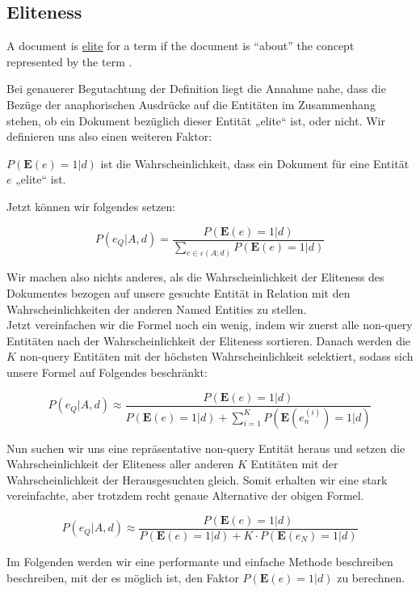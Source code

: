 \subsection{Eliteness}

\begin{defi}
	A document is \underline{elite} for a term if the document is ``about'' the concept represented by the term \cite{paper:Robertson}.
\end{defi}


Bei genauerer Begutachtung der Definition liegt die Annahme nahe, dass die Bezüge der anaphorischen Ausdrücke auf die Entitäten im Zusammenhang stehen, ob ein Dokument bezüglich dieser Entität „elite“ ist, oder nicht. Wir definieren uns also einen weiteren Faktor:

\begin{defi}
$P(\textbf{E}(e) = 1 | d)$ ist die Wahrscheinlichkeit, dass ein Dokument für eine Entität $e$ „elite“ ist.
\end{defi}

Jetzt können wir folgendes setzen:

\[ P(e_Q | A,d) = \frac{P(\textbf{E}(e) = 1 | d)}{\sum_{e \in \varepsilon (A;d)} P(\textbf{E}(e) = 1 | d)} \]

Wir machen also nichts anderes, als die Wahrscheinlichkeit der Eliteness des Dokumentes bezogen auf unsere gesuchte Entität in Relation mit den Wahrscheinlichkeiten der anderen Named Entities zu stellen.\\
Jetzt vereinfachen wir die Formel noch ein wenig, indem wir zuerst alle non-query Entitäten nach der Wahrscheinlichkeit der Eliteness sortieren. Danach werden die $K$ non-query Entitäten mit der höchsten Wahrscheinlichkeit selektiert, sodass sich unsere Formel auf Folgendes beschränkt:

\[ P(e_Q | A,d) \approx \frac{P(\textbf{E}(e) = 1 | d)}{P(\textbf{E}(e) = 1 | d) + \sum_{i=1}^{K} P(\textbf{E}(e_{n}^{(i)}) = 1 | d)} \]

Nun suchen wir uns eine repräsentative non-query Entität heraus und setzen die Wahrscheinlichkeit der Eliteness aller anderen $K$ Entitäten mit der Wahrscheinlichkeit der Herausgesuchten gleich. Somit erhalten wir eine stark vereinfachte, aber trotzdem recht genaue Alternative der obigen Formel.

\[ P(e_Q | A,d) \approx \frac{P(\textbf{E}(e) = 1 | d)}{P(\textbf{E}(e) = 1 | d) + K \cdot P(\textbf{E}(e_N) = 1 | d)} \]

Im Folgenden werden wir eine performante und einfache Methode beschreiben beschreiben, mit der es möglich ist, den Faktor $P(\textbf{E}(e) = 1 | d)$ zu berechnen.

